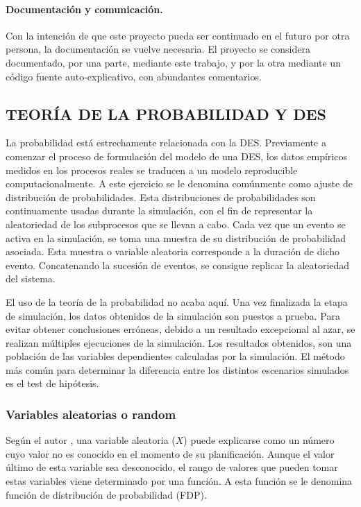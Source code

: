\paragraph{Documentación y comunicación.}

Con la intención de que este proyecto
pueda ser continuado en el futuro por otra persona,
la documentación se vuelve necesaria.
El proyecto se considera documentado,
por una parte, mediante este trabajo,
y por la otra mediante un código fuente auto-explicativo,
con abundantes comentarios.

\subsection{TEORÍA DE LA PROBABILIDAD Y DES}

La probabilidad está estrechamente relacionada con la DES.
Previamente a comenzar el proceso de formulación del modelo de una DES,
los datos empíricos medidos en los procesos reales
se traducen a un modelo reproducible computacionalmente.
A este ejercicio se le denomina comúnmente como
ajuste de distribución de probabilidades.
Esta distribuciones de probabilidades son
continuamente usadas durante la simulación,
con el fin de representar la aleatoriedad de
los subprocesos que se llevan a cabo.
Cada vez que un evento se activa en la simulación,
se toma una muestra de su distribución de probabilidad asociada.
Esta muestra o variable aleatoria corresponde a la duración de dicho evento.
Concatenando la sucesión de eventos,
se consigue replicar la aleatoriedad del sistema.

El uso de la teoría de la probabilidad no acaba aquí.
Una vez finalizada la etapa de simulación,
los datos obtenidos de la simulación son puestos a prueba.
Para evitar obtener conclusiones erróneas,
debido a un resultado excepcional al azar,
se realizan múltiples ejecuciones de la simulación.
Los resultados obtenidos, son una población de
las variables dependientes calculadas por la simulación.
El método más común para determinar la diferencia
entre los distintos escenarios simulados es el test de hipótesis.

\subsubsection{Variables aleatorias o random}

Según el autor \citep{meester2008natural},
una variable aleatoria ($X$) puede explicarse
como un número cuyo valor no es conocido en el momento de su planificación.
Aunque el valor último de esta variable sea desconocido,
el rango de valores que pueden tomar estas variables
viene determinado por una función.
A esta función se le denomina función de distribución de probabilidad (FDP).

